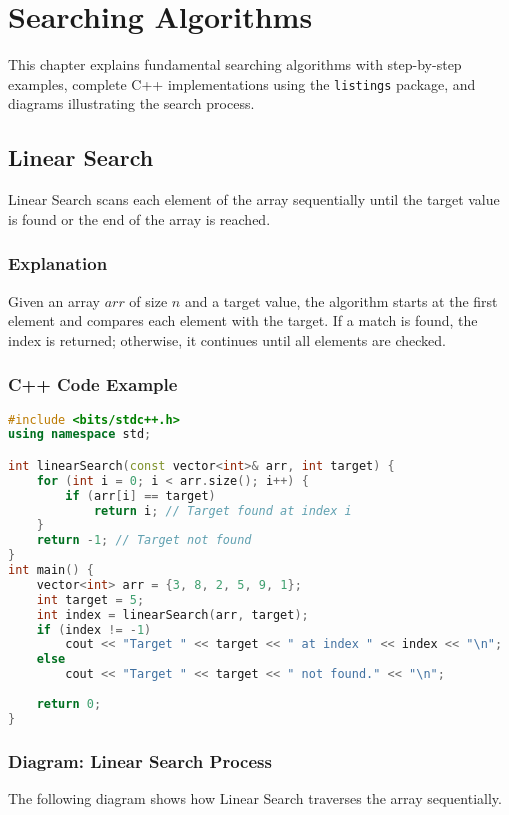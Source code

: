 \chapter{Searching Algorithms}

This chapter explains fundamental searching algorithms with step-by-step examples, complete C++ implementations using the \texttt{listings} package, and diagrams illustrating the search process.

\section{Linear Search}
Linear Search scans each element of the array sequentially until the target value is found or the end of the array is reached.

\subsection{Explanation}
Given an array \( arr \) of size \( n \) and a target value, the algorithm starts at the first element and compares each element with the target. If a match is found, the index is returned; otherwise, it continues until all elements are checked.

\subsection{C++ Code Example}
\begin{lstlisting}[language=C++, caption={Linear Search Implementation}]
#include <bits/stdc++.h>
using namespace std;

int linearSearch(const vector<int>& arr, int target) {
    for (int i = 0; i < arr.size(); i++) {
        if (arr[i] == target)
            return i; // Target found at index i
    }
    return -1; // Target not found
}
int main() {
    vector<int> arr = {3, 8, 2, 5, 9, 1};
    int target = 5;
    int index = linearSearch(arr, target);
    if (index != -1)
        cout << "Target " << target << " at index " << index << "\n";
    else
        cout << "Target " << target << " not found." << "\n";
        
    return 0;
}
\end{lstlisting}

\subsection{Diagram: Linear Search Process}
The following diagram shows how Linear Search traverses the array sequentially.


